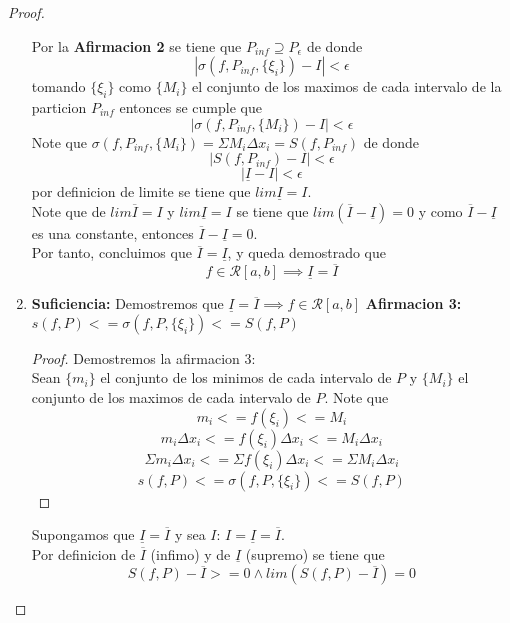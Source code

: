 \documentclass{article}
\begin{document}
\begin{proof}
\begin{enumerate}
Por la \textbf{Afirmacion 2} se tiene que \(P_{inf} \supseteq P_\epsilon\) de donde 
\[
|\sigma(f, P_{inf},\{\xi_i\}) - I| < \epsilon
\]
tomando \(\{\xi_i\}\) como \(\{M_i\}\) el conjunto de los maximos de cada intervalo de la particion \(P_{inf}\) entonces se cumple que
\[
|\sigma(f, P_{inf},\{M_i\}) - I| < \epsilon
\]
Note que \(\sigma(f, P_{inf},\{M_i\}) = \Sigma M_i\Delta x_i = S(f, P_{inf})\) de donde
\[
|S(f, P_{inf}) - I| < \epsilon
\]
\[
|\underline{I} - I| < \epsilon
\]
por definicion de limite se tiene que \(lim\underline{I} = I\).\\

Note que de \(lim\overline{I} = I\) y \(lim\underline{I} = I\) se tiene que \(lim(\overline{I} - \underline{I}) = 0\) y como \(\overline{I} - \underline{I}\) es una constante, entonces \(\overline{I} - \underline{I} = 0\).\\

Por tanto, concluimos que \(\overline{I} = \underline{I}\), y queda demostrado que 
\[f \in \mathcal{R}[a, b] \implies \underline{I} = \overline{I} \]

    \item \textbf{Suficiencia:} Demostremos que \(\underline{I} = \overline{I} \implies f \in \mathcal{R}[a, b]\)
\textbf{Afirmacion 3:} \(s(f, P) <= \sigma(f, P,\{\xi_i\}) <= S(f, P)\)
\begin{proof}
Demostremos la afirmacion 3:\\
Sean \(\{m_i\}\) el conjunto de los minimos de cada intervalo de \(P\) y \(\{M_i\}\) el conjunto de los maximos de cada intervalo de \(P\).
Note que 
\[
m_i <= f(\xi_i) <= M_i
\]
\[
m_i \Delta x_i <= f(\xi_i)\Delta x_i <= M_i\Delta x_i
\] 
\[
\Sigma m_i \Delta x_i <= \Sigma f(\xi_i)\Delta x_i <= \Sigma M_i\Delta x_i
\]
\[
s(f, P) <= \sigma(f, P,\{\xi_i\}) <= S(f, P)
\]
\end{proof}
Supongamos que  \(\underline{I} = \overline{I}\) y sea \(I\): \(I = \underline{I} = \overline{I}\).\\

Por definicion de \(\overline{I}\) (infimo) y de \(\underline{I}\) (supremo) se tiene que 
\[
S(f, P) - \overline{I} >= 0 \wedge lim (S(f, P) - \overline{I}) = 0
\]


\end{enumerate}
\end{proof}
\end{document}
